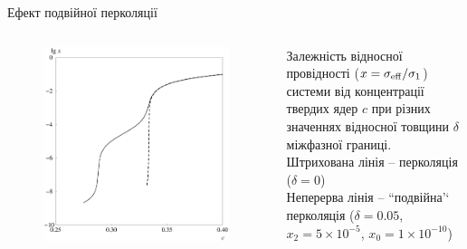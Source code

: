 \documentclass[10pt]{beamer}
\begin{document}
\begin{frame}{Ефект подвійної перколяції}
\footnotesize

\vspace{-10pt}
\begin{columns}[T,onlytextwidth]
      \begin{figure}
        \centering
        \includegraphics[width=0.99\textwidth]{images/Permit5.eps}
      \end{figure}
        \vspace{-10pt}
        Залежність відносної провідності 
 ($x = \sigma_{\rm eff}/\sigma_1$) системи від 
концентрації твердих ядер $c$ 
при різних значеннях відносної 
товщини $\delta$ міжфазної границі.\\            
Штрихована лінія -- перколяція ($\delta=0$)\\
Неперерва лінія -- ``подвійна'‘ перколяція
($\delta=0.05$, $x_2 = 5 \times 10^{-5}$, $x_0 = 1 \times 10^{-10}$)                             


\end{columns}
\end{frame}
\end{document}
